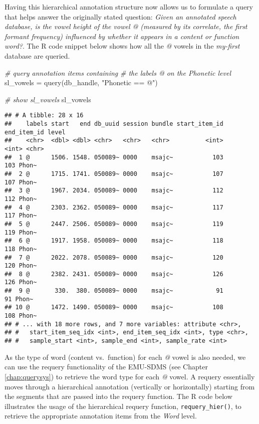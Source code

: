 \documentclass[
]{book}
\newenvironment{Shaded}{\begin{snugshade}}{\end{snugshade}}
\newcommand{\CommentTok}[1]{\textcolor[rgb]{0.56,0.35,0.01}{\textit{#1}}}
\newcommand{\FunctionTok}[1]{\textcolor[rgb]{0.00,0.00,0.00}{#1}}
\newcommand{\NormalTok}[1]{#1}
\newcommand{\OtherTok}[1]{\textcolor[rgb]{0.56,0.35,0.01}{#1}}
\newcommand{\StringTok}[1]{\textcolor[rgb]{0.31,0.60,0.02}{#1}}
\begin{document}
Having this hierarchical annotation structure now allows us to formulate a query that helps answer the originally stated question: \emph{Given an annotated speech database, is the vowel height of the vowel @ (measured by its correlate, the first formant frequency) influenced by whether it appears in a content or function word?}. The R code snippet below shows how all the \emph{@} vowels in the \emph{my-first} database are queried.

\begin{Shaded}
\begin{Highlighting}[]
\CommentTok{\# query annotation items containing}
\CommentTok{\# the labels @ on the Phonetic level}
\NormalTok{sl\_vowels }\OtherTok{=} \FunctionTok{query}\NormalTok{(db\_handle, }\StringTok{"Phonetic == @"}\NormalTok{)}

\CommentTok{\# show sl\_vowels}
\NormalTok{sl\_vowels}
\end{Highlighting}
\end{Shaded}

\begin{verbatim}
## # A tibble: 28 x 16
##    labels start   end db_uuid session bundle start_item_id end_item_id level
##    <chr>  <dbl> <dbl> <chr>   <chr>   <chr>          <int>       <int> <chr>
##  1 @      1506. 1548. 050089~ 0000    msajc~           103         103 Phon~
##  2 @      1715. 1741. 050089~ 0000    msajc~           107         107 Phon~
##  3 @      1967. 2034. 050089~ 0000    msajc~           112         112 Phon~
##  4 @      2303. 2362. 050089~ 0000    msajc~           117         117 Phon~
##  5 @      2447. 2506. 050089~ 0000    msajc~           119         119 Phon~
##  6 @      1917. 1958. 050089~ 0000    msajc~           118         118 Phon~
##  7 @      2022. 2078. 050089~ 0000    msajc~           120         120 Phon~
##  8 @      2382. 2431. 050089~ 0000    msajc~           126         126 Phon~
##  9 @       330.  380. 050089~ 0000    msajc~            91          91 Phon~
## 10 @      1472. 1490. 050089~ 0000    msajc~           108         108 Phon~
## # ... with 18 more rows, and 7 more variables: attribute <chr>,
## #   start_item_seq_idx <int>, end_item_seq_idx <int>, type <chr>,
## #   sample_start <int>, sample_end <int>, sample_rate <int>
\end{verbatim}

As the type of word (content vs.~function) for each \emph{@} vowel is also needed, we can use the requery functionality of the EMU-SDMS (see Chapter \ref{chap:querysys}) to retrieve the word type for each \emph{@} vowel. A requery essentially moves through a hierarchical annotation (vertically or horizontally) starting from the segments that are passed into the requery function. The R code below illustrates the usage of the hierarchical requery function, \texttt{requery\_hier()}, to retrieve the appropriate annotation items from the \emph{Word} level.
\end{document}
